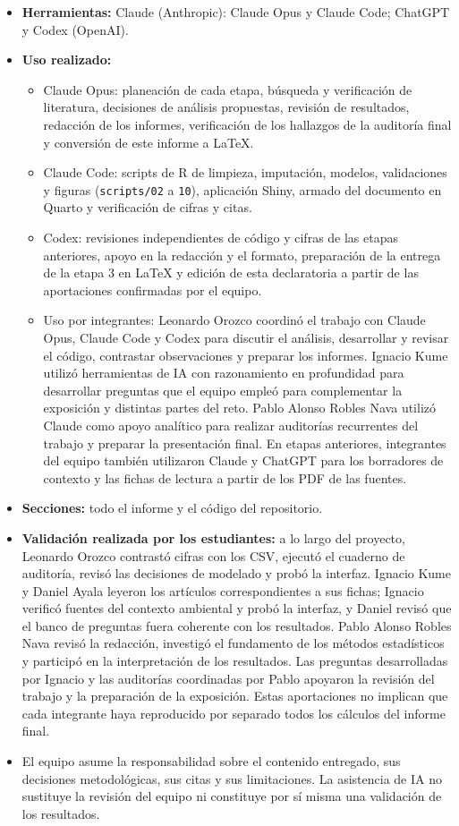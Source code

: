 \begin{itemize}
\item \textbf{Herramientas:} Claude (Anthropic): Claude Opus y Claude Code; ChatGPT y Codex (OpenAI).
\item \textbf{Uso realizado:}
  \begin{itemize}
  \item Claude Opus: planeación de cada etapa, búsqueda y verificación de literatura, decisiones de análisis propuestas, revisión de resultados, redacción de los informes, verificación de los hallazgos de la auditoría final y conversión de este informe a LaTeX.
  \item Claude Code: scripts de R de limpieza, imputación, modelos, validaciones y figuras (\texttt{scripts/02} a \texttt{10}), aplicación Shiny, armado del documento en Quarto y verificación de cifras y citas.
  \item Codex: revisiones independientes de código y cifras de las etapas anteriores, apoyo en la redacción y el formato, preparación de la entrega de la etapa 3 en LaTeX y edición de esta declaratoria a partir de las aportaciones confirmadas por el equipo.
  \item Uso por integrantes: Leonardo Orozco coordinó el trabajo con Claude Opus, Claude Code y Codex para discutir el análisis, desarrollar y revisar el código, contrastar observaciones y preparar los informes. Ignacio Kume utilizó herramientas de IA con razonamiento en profundidad para desarrollar preguntas que el equipo empleó para complementar la exposición y distintas partes del reto. Pablo Alonso Robles Nava utilizó Claude como apoyo analítico para realizar auditorías recurrentes del trabajo y preparar la presentación final. En etapas anteriores, integrantes del equipo también utilizaron Claude y ChatGPT para los borradores de contexto y las fichas de lectura a partir de los PDF de las fuentes.
  \end{itemize}
\item \textbf{Secciones:} todo el informe y el código del repositorio.
\item \textbf{Validación realizada por los estudiantes:} a lo largo del proyecto, Leonardo Orozco contrastó cifras con los CSV, ejecutó el cuaderno de auditoría, revisó las decisiones de modelado y probó la interfaz. Ignacio Kume y Daniel Ayala leyeron los artículos correspondientes a sus fichas; Ignacio verificó fuentes del contexto ambiental y probó la interfaz, y Daniel revisó que el banco de preguntas fuera coherente con los resultados. Pablo Alonso Robles Nava revisó la redacción, investigó el fundamento de los métodos estadísticos y participó en la interpretación de los resultados. Las preguntas desarrolladas por Ignacio y las auditorías coordinadas por Pablo apoyaron la revisión del trabajo y la preparación de la exposición. Estas aportaciones no implican que cada integrante haya reproducido por separado todos los cálculos del informe final.
\item El equipo asume la responsabilidad sobre el contenido entregado, sus decisiones metodológicas, sus citas y sus limitaciones. La asistencia de IA no sustituye la revisión del equipo ni constituye por sí misma una validación de los resultados.
\end{itemize}
